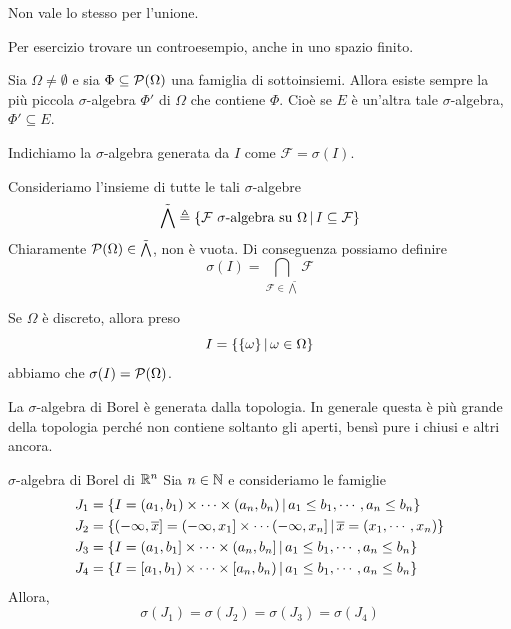\documentclass[a4paper]{article}
\begin{document}
\begin{snippetproposition}{}
    Non vale lo stesso per l'unione.
\end{snippetproposition}

\begin{snippetexercise}{}
    Per esercizio trovare un controesempio, anche in uno spazio finito.
\end{snippetexercise}

\begin{snippetproposition}{}
    Sia \(\Omega \neq \emptyset\) e sia \(\Phi \subseteq \mathcal P(\Omega)\)
    una famiglia di sottoinsiemi. Allora esiste sempre la più piccola \(\sigma\)-algebra
    \(\Phi'\) di \(\Omega\) che contiene \(\Phi\).
    Cioè se \(E\) è un'altra tale \(\sigma\)-algebra, \(\Phi' \subseteq E\).
\end{snippetproposition}

Indichiamo la \(\sigma\)-algebra generata da \(I\)
come \(\mathcal F = \sigma(I)\).

\begin{snippetproof}{}
    Consideriamo l'insieme di tutte le tali \(\sigma\)-algebre
    \[
        \tilde \bigwedge \triangleq \{
            \mathcal F \text{ \(\sigma\)-algebra su } \Omega
            \,|\, I \subseteq \mathcal F
        \}
    \]
    Chiaramente \(\mathcal P(\Omega) \in \tilde \bigwedge\),
    non è vuota. Di conseguenza possiamo definire
    \[
        \sigma(I) = \bigcap_{\mathcal F \in \tilde \bigwedge} \mathcal F
    \]
\end{snippetproof}

Se \(\Omega\)
è discreto, allora preso
\[
    I = \{
        \{\omega\}
        \,|\, \omega \in \Omega
    \}
\]
abbiamo che \(\sigma(I) = \mathcal P(\Omega)\).

La \(\sigma\)-algebra di Borel è generata dalla topologia.
In generale questa è più grande della topologia perché non contiene soltanto gli aperti,
bensì pure i chiusi e altri ancora.

\begin{snippetproposition}{\(\sigma\)-algebra di Borel di \(\mathbb{R}^n\)}
    Sia \(n \in \mathbb{N}\) e consideriamo le famiglie
    \begin{align*}
        J_1 &= \{
            I = (a_1, b_1) \times \cdots \times (a_n, b_n)
            \,|\, a_1 \leq b_1, \cdots, a_n \leq b_n
        \} \\
        J_2 &= \{
            (-\infty, \overline x]
            = (-\infty, x_1]
            \times \cdots (-\infty, x_n]
            \,|\, \overline x = (x_1, \cdots, x_n)
        \} \\
        J_3 &= \{
            I = (a_1, b_1] \times \cdots \times (a_n, b_n]
            \,|\, a_1 \leq b_1, \cdots, a_n \leq b_n
        \} \\
        J_4 &= \{
            I = [a_1, b_1) \times \cdots \times [a_n, b_n)
            \,|\, a_1 \leq b_1, \cdots, a_n \leq b_n
        \}
    \end{align*}
    Allora, \[
        \sigma(J_1) = \sigma(J_2) = \sigma(J_3) = \sigma(J_4)
    \]
\end{snippetproposition}
\end{document}
